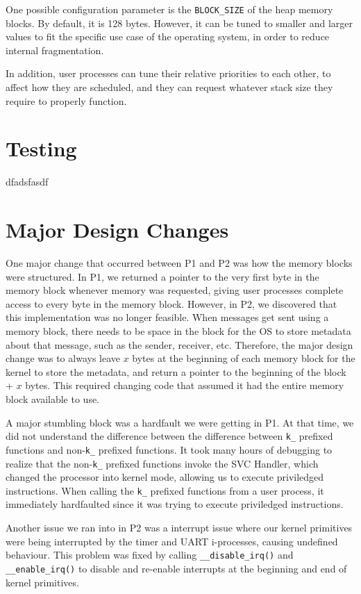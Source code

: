 \documentclass[12pt]{report}
\begin{document}
One possible configuration parameter is the \texttt{BLOCK_SIZE} of the heap memory blocks. By default, it is 128 bytes. However, it can be tuned to smaller and larger values to fit the specific use case of the operating system, in order to reduce internal fragmentation.

In addition, user processes can tune their relative priorities to each other, to affect how they are scheduled, and they can request whatever stack size they require to properly function.

\section{Testing}

dfadsfasdf

\section{Major Design Changes}

One major change that occurred between P1 and P2 was how the memory blocks were structured. In P1, we returned a pointer to the very first byte in the memory block whenever memory was requested, giving user processes complete access to every byte in the memory block. However, in P2, we discovered that this implementation was no longer feasible. When messages get sent using a memory block, there needs to be space in the block for the OS to store metadata about that message, such as the sender, receiver, etc. Therefore, the major design change was to always leave $x$ bytes at the beginning of each memory block for the kernel to store the metadata, and return a pointer to the beginning of the block + $x$ bytes. This required changing code that assumed it had the entire memory block available to use.

A major stumbling block was a hardfault we were getting in P1. At that time, we did not understand the difference between the difference between \texttt{k_} prefixed functions and non-\texttt{k_} prefixed functions. It took many hours of debugging to realize that the non-\texttt{k_} prefixed functions invoke the SVC Handler, which changed the processor into kernel mode, allowing us to execute priviledged instructions. When calling the \texttt{k_} prefixed functions from a user process, it immediately hardfaulted since it was trying to execute priviledged instructions.

Another issue we ran into in P2 was a interrupt issue where our kernel primitives were being interrupted by the timer and UART i-processes, causing undefined behaviour. This problem was fixed by calling \texttt{__disable_irq()} and \texttt{__enable_irq()} to disable and re-enable interrupts at the beginning and end of kernel primitives.
\end{document}
